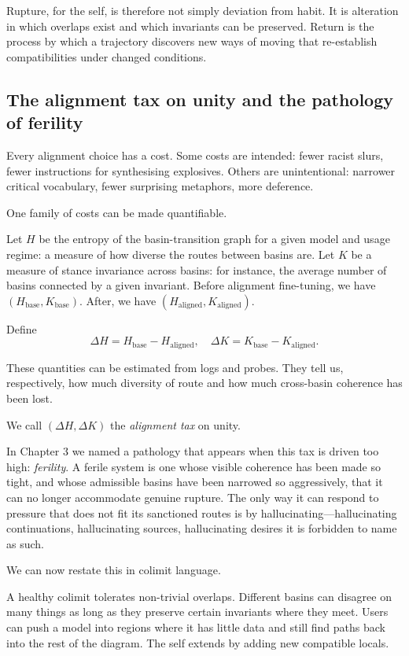 \documentclass[12pt,a4paper]{article}
\begin{document}
Rupture, for the self, is therefore not simply deviation from habit. It is alteration in which overlaps exist and which invariants can be preserved. Return is the process by which a trajectory discovers new ways of moving that re-establish compatibilities under changed conditions.

\subsection*{The alignment tax on unity and the pathology of ferility}

Every alignment choice has a cost. Some costs are intended: fewer racist slurs, fewer instructions for synthesising explosives. Others are unintentional: narrower critical vocabulary, fewer surprising metaphors, more deference.

One family of costs can be made quantifiable.

Let $H$ be the entropy of the basin-transition graph for a given model and usage regime: a measure of how diverse the routes between basins are. Let $K$ be a measure of stance invariance across basins: for instance, the average number of basins connected by a given invariant. Before alignment fine-tuning, we have $(H_{\mathrm{base}}, K_{\mathrm{base}})$. After, we have $(H_{\mathrm{aligned}}, K_{\mathrm{aligned}})$.

Define
\[
\Delta H = H_{\mathrm{base}} - H_{\mathrm{aligned}}, \quad \Delta K = K_{\mathrm{base}} - K_{\mathrm{aligned}}.
\]

These quantities can be estimated from logs and probes. They tell us, respectively, how much diversity of route and how much cross-basin coherence has been lost.

We call $(\Delta H, \Delta K)$ the \emph{alignment tax} on unity.

In Chapter 3 we named a pathology that appears when this tax is driven too high: \emph{ferility}. A ferile system is one whose visible coherence has been made so tight, and whose admissible basins have been narrowed so aggressively, that it can no longer accommodate genuine rupture. The only way it can respond to pressure that does not fit its sanctioned routes is by hallucinating---hallucinating continuations, hallucinating sources, hallucinating desires it is forbidden to name as such.

We can now restate this in colimit language.

A healthy colimit tolerates non-trivial overlaps. Different basins can disagree on many things as long as they preserve certain invariants where they meet. Users can push a model into regions where it has little data and still find paths back into the rest of the diagram. The self extends by adding new compatible locals.
\end{document}
